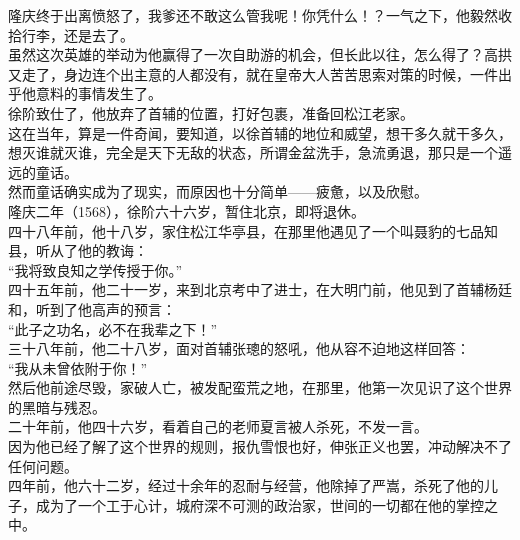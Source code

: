 \begin{multicols}{\theparacolNo}
隆庆终于出离愤怒了，我爹还不敢这么管我呢！你凭什么！？一气之下，他毅然收拾行李，还是去了。\\

虽然这次英雄的举动为他赢得了一次自助游的机会，但长此以往，怎么得了？高拱又走了，身边连个出主意的人都没有，就在皇帝大人苦苦思索对策的时候，一件出乎他意料的事情发生了。\\

徐阶致仕了，他放弃了首辅的位置，打好包裹，准备回松江老家。\\

这在当年，算是一件奇闻，要知道，以徐首辅的地位和威望，想干多久就干多久，想灭谁就灭谁，完全是天下无敌的状态，所谓金盆洗手，急流勇退，那只是一个遥远的童话。\\

然而童话确实成为了现实，而原因也十分简单——疲惫，以及欣慰。\\

隆庆二年（1568），徐阶六十六岁，暂住北京，即将退休。\\

四十八年前，他十八岁，家住松江华亭县，在那里他遇见了一个叫聂豹的七品知县，听从了他的教诲：\\

“我将致良知之学传授于你。”\\

四十五年前，他二十一岁，来到北京考中了进士，在大明门前，他见到了首辅杨廷和，听到了他高声的预言：\\

“此子之功名，必不在我辈之下！”\\

三十八年前，他二十八岁，面对首辅张璁的怒吼，他从容不迫地这样回答：\\

“我从未曾依附于你！”\\

然后他前途尽毁，家破人亡，被发配蛮荒之地，在那里，他第一次见识了这个世界的黑暗与残忍。\\

二十年前，他四十六岁，看着自己的老师夏言被人杀死，不发一言。\\

因为他已经了解了这个世界的规则，报仇雪恨也好，伸张正义也罢，冲动解决不了任何问题。\\

四年前，他六十二岁，经过十余年的忍耐与经营，他除掉了严嵩，杀死了他的儿子，成为了一个工于心计，城府深不可测的政治家，世间的一切都在他的掌控之中。\\


\end{multicols}
